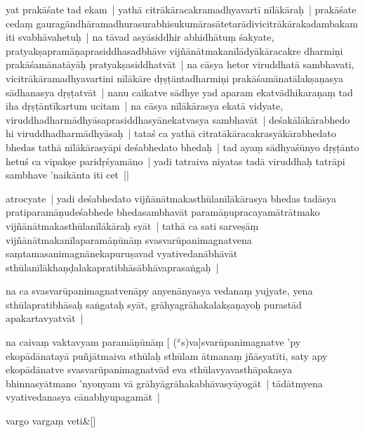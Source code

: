 \documentclass[article,12pt,a4paper]{memoir}
\newcommand{\corr}[1]{($^{x}$#1)}
\begin{document}
	  \pstart yat prakāśate tad ekam | yathā citrākāracakramadhyavartī nīlākāraḥ | prakāśate cedaṃ gauragāndhāramadhurasurabhisukumārasātetarādivicitrākārakadambakam iti svabhāvahetuḥ | \label{thakur75-129.25} na tāvad asyāsiddhir abhidhātuṃ śakyate, pratyakṣapramāṇaprasiddhasadbhāve vijñānātmakanīlādyākāracakre dharmiṇi prakāśamānatāyāḥ pratyakṣasiddhatvāt | na cāsya \leavevmode{}\label{thakur75-130} hetor viruddhatā sambhavati, vicitrākāramadhyavartini nīlākāre dṛṣṭāntadharmiṇi prakāśamānatālakṣaṇasya sādhanasya dṛṣṭatvāt | nanu caikatve sādhye yad aparam ekatvādhikaraṇaṃ tad iha dṛṣṭāntīkartum ucitam | na cāsya nīlākārasya ekatā vidyate, viruddhadharmādhyāsaprasiddhasyānekatvasya sambhavāt | deśakālākārabhedo hi viruddhadharmādhyāsaḥ | tataś ca yathā citratākāracakrasyākārabhedato bhedas tathā nīlākārasyāpi deśabhedato bhedaḥ | tad ayaṃ sādhyaśūnyo dṛṣṭānto hetuś ca vipakṣe paridṛśyamāno | yadi tatraiva niyatas tadā viruddhaḥ \label{thakur75-130.8} tatrāpi sambhave 'naikānta iti cet ||
	\pend
      

	  \pstart atrocyate | yadi deśabhedato vijñānātmakasthūlanīlākārasya bhedas tadāsya pratiparamāṇudeśabhede bhedasambhavāt paramāṇupracayamātrātmako vijñānātmakasthūlanīlākāraḥ syāt | tathā ca sati sarveṣāṃ vijñānātmakanīlaparamāṇūnāṃ svasvarūpanimagnatvena saṃtamasanimagnānekapuruṣavad vyativedanābhāvāt sthūlanīlākhaṇḍalakapratibhāsābhāvaprasaṅgaḥ |
	\pend
      

	  \pstart na ca svasvarūpanimagnatvenāpy anyenānyasya vedanaṃ yujyate, yena sthūlapratibhāsaḥ saṅgataḥ syāt, grāhyagrāhakalakṣaṇayoḥ purastād apakartavyatvāt |
	\pend
      

	  \pstart na caivaṃ vaktavyam paramāṇūnāṃ [ {\corr sva}]svarūpanimagnatve 'py ekopādānatayā puñjātmaiva sthūlaḥ sthūlam ātmanaṃ jñāsyatīti, saty apy ekopādānatve svasvarūpanimagnatvād eva sthūlavyavasthāpakasya bhinnasyātmano 'nyonyam vā grāhyāgrāhakabhāvasyāyogāt | tādātmyena vyativedanasya cānabhyupagamāt |
	\pend
      
	    
	    \stanza[\smallbreak]
	vargo vargaṃ veti\&[\smallbreak]


	
\end{document}
